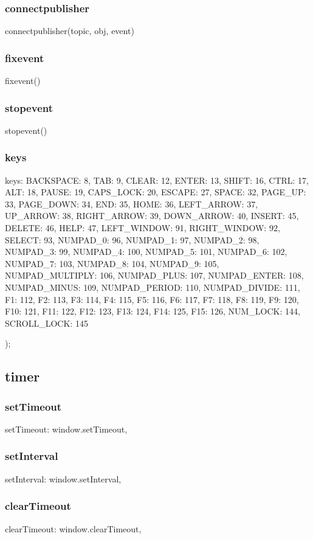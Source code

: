 {\subsubsection*{connectpublisher}
connectpublisher(topic, obj, event)
\subsubsection*{fixevent}
fixevent()
\subsubsection*{stopevent}
stopevent()
\subsubsection*{keys}
keys: { BACKSPACE: 8, TAB: 9, CLEAR: 12, ENTER: 13, SHIFT: 16, CTRL: 17, ALT:
18, PAUSE: 19, CAPS_LOCK: 20, 
		    ESCAPE: 27, SPACE: 32, PAGE_UP: 33, PAGE_DOWN: 34, END: 35,
HOME: 36, LEFT_ARROW: 37, UP_ARROW: 38,
		    RIGHT_ARROW: 39, DOWN_ARROW: 40, INSERT: 45, DELETE: 46,
HELP: 47, LEFT_WINDOW: 91, RIGHT_WINDOW: 92,
		    SELECT: 93, NUMPAD_0: 96, NUMPAD_1: 97, NUMPAD_2: 98,
NUMPAD_3: 99, NUMPAD_4: 100, NUMPAD_5: 101,
		    NUMPAD_6: 102, NUMPAD_7: 103, NUMPAD_8: 104, NUMPAD_9: 105,
NUMPAD_MULTIPLY: 106, NUMPAD_PLUS: 107,
		    NUMPAD_ENTER: 108, NUMPAD_MINUS: 109, NUMPAD_PERIOD: 110,
NUMPAD_DIVIDE: 111, F1: 112, F2: 113, F3: 114,
		    F4: 115, F5: 116, F6: 117, F7: 118, F8: 119, F9: 120, F10:
121, F11: 122, F12: 123, F13: 124, 
		    F14: 125, F15: 126, NUM_LOCK: 144, SCROLL_LOCK: 145 }
    });

\subsection{timer}
\subsubsection*{setTimeout}
setTimeout: window.setTimeout,
\subsubsection*{setInterval}
setInterval: window.setInterval,
\subsubsection*{clearTimeout}
clearTimeout: window.clearTimeout,
